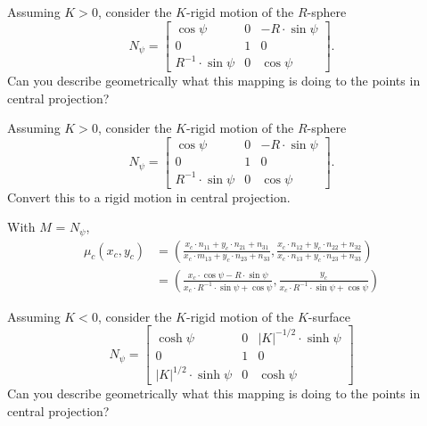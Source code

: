 \documentclass[newpage,hints,handout]{ximera}
\begin{document}
\begin{problem}
  Assuming $K > 0$, consider the $K$-rigid motion of the $R$-sphere
  \[
  N_\psi=
  \begin{bmatrix}
    \cos\psi & 0 & -R\cdot\sin\psi\\
    0 & 1 & 0\\
    R^{-1}\cdot\sin\psi & 0 & \cos\psi
  \end{bmatrix}.
  \]
Can you describe geometrically what this mapping is doing to the
points in central projection?  
\end{problem}


\begin{problem}
  Assuming $K > 0$, consider the $K$-rigid motion of the $R$-sphere
  \[
  N_\psi=
  \begin{bmatrix}
    \cos\psi & 0 & -R\cdot\sin\psi\\
    0 & 1 & 0\\
    R^{-1}\cdot\sin\psi & 0 & \cos\psi
  \end{bmatrix}.
  \]
  Convert this to a rigid motion in central projection.
  
  \begin{freeResponse}
   With $M$ = $N_\psi$,
  \begin{align*}
  \mu_c(x_c,y_c) &= \left( \frac{x_c\cdot n_{11} + y_c\cdot n_{21} + n_{31}}{x_c\cdot m_{13} + y_c\cdot n_{23} + n_{33}},
    \frac{x_c\cdot n_{12} + y_c\cdot n_{22} + n_{32}}{x_c\cdot n_{13} + y_c\cdot n_{23} + n_{33}} \right) \\
    &= \left( \frac{x_c\cdot \cos\psi - R\cdot \sin\psi}{x_c\cdot R^{-1} \cdot \sin\psi + \cos\psi},
    \frac{y_c}{x_c\cdot R^{-1} \cdot \sin\psi + \cos\psi} \right) 
  \end{align*}
  \end{freeResponse}

\end{problem}


\begin{problem}
  Assuming $K < 0$, consider the $K$-rigid motion of the $K$-surface
  \[
  N_\psi=
  \begin{bmatrix}
    \cosh\psi & 0 & |K|^{-1/2}\cdot\sinh\psi\\
    0 & 1 & 0\\
    |K|^{1/2}\cdot\sinh\psi & 0 & \cosh\psi
  \end{bmatrix}
  \]
  Can you describe geometrically what this mapping is doing to the
  points in central projection?
\end{problem}
\end{document}
